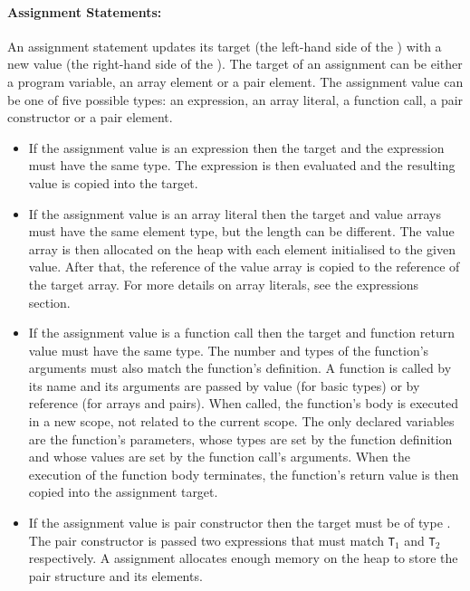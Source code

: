 \documentclass[a4paper]{article}
\theoremstyle{definition}
\newtheorem{question}{Gap}
\newcommand{\fillgap}[2]{
  \begin{center}
  \fbox{
    \begin{minipage}{4in}
      \begin{question}
        {\it #1} \hfill ({\bf #2})
      \end{question}
    \end{minipage}
  }
\end{center}
}
\begin{document}
\fillgap{Complete the above paragraph}{5 marks}

\paragraph{Assignment Statements:}
An assignment statement updates its target (the left-hand side of the \lit{=}) with a new value (the right-hand side of the \lit{=}).
The target of an assignment can be either a program variable, an array element or a pair element.
The assignment value can be one of five possible types: an expression, an array literal, a function call, a pair constructor or a pair element.
\begin{itemize}
 \item If the assignment value is an expression  then 
       the target and the expression must have the same type.
       The expression is then evaluated and the resulting value is copied into the target.
 \item If the assignment value is an array literal  then the target and value arrays must have the same element type, 
       but the length can be different. 
       The value array is then allocated on the heap with each element initialised to the given value. After that, the reference of the value array is copied to the reference of the target array.
       For more details on array literals, see the expressions section.
 \item If the assignment value is a function call  then the target and function return value must have the same type. 
       The number and types of the function's arguments must also match the function's definition.
       A function is called by its name and its arguments are passed by value (for basic types) or by reference (for arrays and pairs).
       When called, the function's body is executed in a new scope, not related to the current scope.
       The only declared variables are the function's parameters, whose types are set by the function definition and whose values are set by the function call's arguments.
       When the execution of the function body terminates, the function's return value is then copied into the assignment target.
 \item If the assignment value is pair constructor  then the target must be of type .
       The pair constructor is passed two expressions that must match {\tt T}$_1$ and {\tt T}$_2$ respectively.
       A  assignment allocates enough memory on the heap to store the pair structure and its elements.

\end{itemize}
\end{document}

